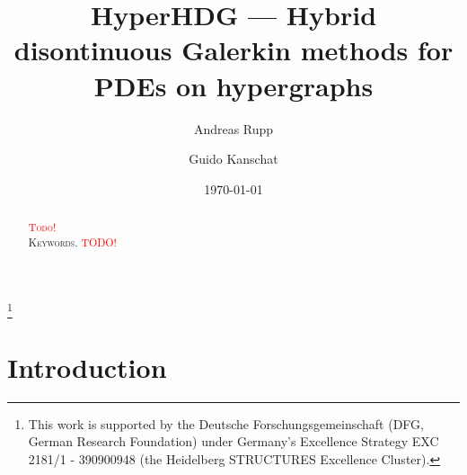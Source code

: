 \documentclass[a4paper, english, 12pt, reqno, draft]{amsart}
\theoremstyle{definition}
\theoremstyle{remark}
\numberwithin{equation}{section}
\begin{document}
\title{H\MakeLowercase{yper}HDG --- Hybrid disontinuous Galerkin methods for PDEs on hypergraphs} 

\author{Andreas Rupp}
\address{Interdisciplinary Center for Scientific Computing (IWR), Heidelberg University, Mathematikon, Im Neuenheimer Feld 205, 69120 Heidelberg, Germany}
\thanks{This work is supported by the Deutsche Forschungsgemeinschaft (DFG, German Research Foundation) under Germany's Excellence Strategy EXC 2181/1 - 390900948 (the Heidelberg STRUCTURES Excellence Cluster).}

\author{Guido Kanschat}
\address{Interdisciplinary Center for Scientific Computing (IWR) and Mathematics Center Heidelberg (MATCH), Heidelberg University, Mathematikon, Im Neuenheimer Feld 205, 69120 Heidelberg, Germany}

\subjclass[2010]{\textcolor{red}{TODO}}

\date{\today}


\begin{abstract}
 \textcolor{red}{\textsc{Todo!}} 
 \\[1ex] \noindent \textsc{Keywords.}
 \textcolor{red}{TODO!}
\end{abstract}
% 
\maketitle
% 
\section{Introduction}
% 
% 


% 
\end{document}
